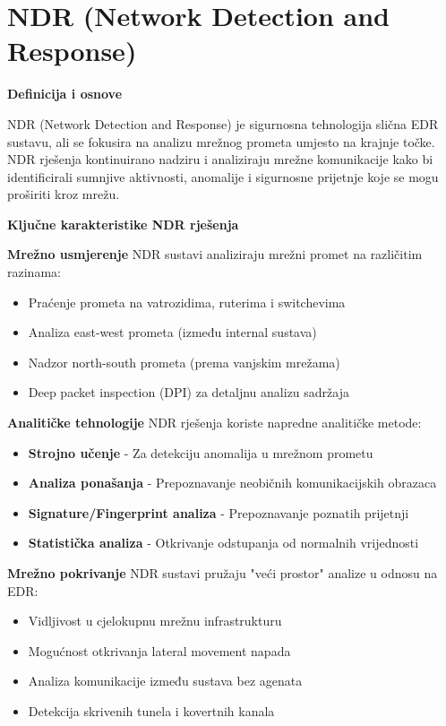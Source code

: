 \chapter{NDR (Network Detection and Response)}

\textbf{Definicija i osnove}

NDR (Network Detection and Response) je sigurnosna tehnologija slična EDR sustavu, ali se fokusira na analizu mrežnog prometa umjesto na krajnje točke. NDR rješenja kontinuirano nadziru i analiziraju mrežne komunikacije kako bi identificirali sumnjive aktivnosti, anomalije i sigurnosne prijetnje koje se mogu proširiti kroz mrežu.

\textbf{Ključne karakteristike NDR rješenja}

\textbf{Mrežno usmjerenje}
NDR sustavi analiziraju mrežni promet na različitim razinama:
\begin{itemize}
\item Praćenje prometa na vatrozidima, ruterima i switchevima
\item Analiza east-west prometa (između internal sustava)
\item Nadzor north-south prometa (prema vanjskim mrežama)
\item Deep packet inspection (DPI) za detaljnu analizu sadržaja
\end{itemize}

\textbf{Analitičke tehnologije}
NDR rješenja koriste napredne analitičke metode:
\begin{itemize}
\item \textbf{Strojno učenje} - Za detekciju anomalija u mrežnom prometu
\item \textbf{Analiza ponašanja} - Prepoznavanje neobičnih komunikacijskih obrazaca
\item \textbf{Signature/Fingerprint analiza} - Prepoznavanje poznatih prijetnji
\item \textbf{Statistička analiza} - Otkrivanje odstupanja od normalnih vrijednosti
\end{itemize}

\textbf{Mrežno pokrivanje}
NDR sustavi pružaju "veći prostor" analize u odnosu na EDR:
\begin{itemize}
\item Vidljivost u cjelokupnu mrežnu infrastrukturu
\item Mogućnost otkrivanja lateral movement napada
\item Analiza komunikacije između sustava bez agenata
\item Detekcija skrivenih tunela i kovertnih kanala
\end{itemize}

